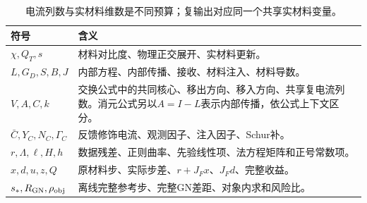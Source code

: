 \begin{table}[htbp]\centering\small
\begin{tabularx}{\linewidth}{lX}\toprule
符号&含义\\\midrule
$\chi,Q_T,s$&材料对比度、物理正交展开、实材料更新。\\
$L,G_D,S,B,J$&内部方程、内部传播、接收、材料注入、材料导数。\\
$V,A,C,k$&交换公式中的共同核心、移出方向、移入方向、共享复电流列数。消元公式另以$A=I-L$表示内部传播，依公式上下文区分。\\
$\bar C,Y_C,N_C,\Gamma_C$&反馈修饰电流、观测因子、注入因子、Schur补。\\
$r,\Lambda,\ell,H,h$&数据残差、正则曲率、先验线性项、法方程矩阵和正号常数项。\\
$x,d,u,z,Q$&原材料步、实际步差、$r+J_Fx$、$J_Fd$、完整收益。\\
$s_*,R_{\rm GN},\rho_{\rm obj}$&离线完整参考步、完整GN差距、对象内求和风险比。\\
\bottomrule\end{tabularx}
\caption{电流列数与实材料维数是不同预算；复输出对应同一个共享实材料变量。}
\end{table}\clearpage
